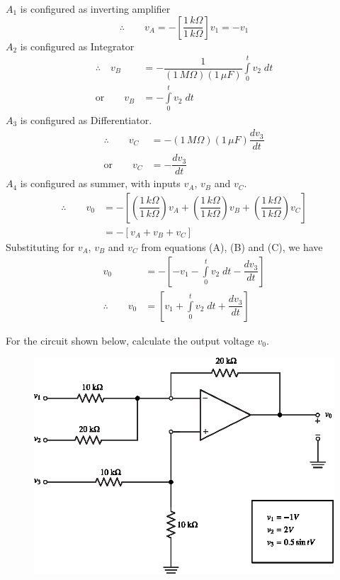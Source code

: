 \begin{solution}
$A_{1}$ is configured as inverting amplifier
\begin{equation*}
\therefore\qquad v_{A}=-\left[\dfrac{1\,k\Omega}{1\,k\Omega}\right]v_{1}=-v_{1}\tag{A}
\end{equation*}
$A_{2}$ is configured as Integrator
\begin{align*}
\therefore\quad v_{B} &=-\dfrac{1}{(1\,M\Omega)(1\,\mu F)}\int\limits^{t}_{0}v_{2}\; dt\\[5pt]
\text{or}\qquad v_{B} &= -\int\limits^{t}_{0}v_{2}\; dt\tag{B}
\end{align*}
$A_{3}$ is configured as Differentiator.
\begin{align*}
\therefore\qquad v_{C} &=-(1\,M\Omega)(1\,\mu F)\dfrac{dv_{3}}{dt}\\[5pt]
\text{or}\qquad v_{C} &= -\dfrac{dv_{3}}{dt}\tag{C}
\end{align*}
$A_{4}$ is configured as summer, with inputs $v_{A}$, $v_{B}$ and $v_{C}$.
\begin{align*}
\therefore\qquad v_{0} &= -\left[\left(\dfrac{1\,k\Omega}{1\,k\Omega}\right)v_{A}+\left(\dfrac{1\,k\Omega}{1\,k\Omega}\right)v_{B}+\left(\dfrac{1\,k\Omega}{1\,k\Omega}\right)v_{C}\right]\\[5pt]
&= -\left[v_{A}+v_{B}+v_{C}\right]\tag{D}
\end{align*}
Substituting for $v_{A}$, $v_{B}$ and $v_{C}$ from equations (A), (B) and (C), we have
\begin{align*}
v_{0} &=-\left[-v_{1}-\int\limits^{t}_{0}v_{2}\;dt-\dfrac{d v_{3}}{dt}\right]\\[5pt]
\therefore\qquad v_{0} &= \left[v_{1}+\int\limits^{t}_{0}v_{2}\;dt+\dfrac{dv_{3}}{dt}\right]\tag{E}
\end{align*}
\end{solution}

\eject

\begin{example}%
For the circuit shown below, calculate the output voltage $v_{0}$.
\begin{figure}[H]
\centering
\includegraphics{chap4/exp4.29.eps}
\end{figure}
\end{example}

